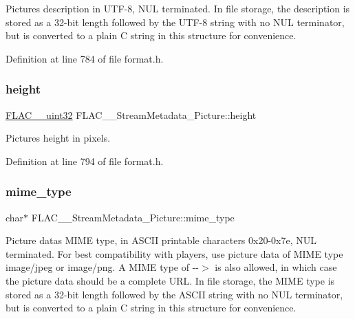 Picture\textquotesingle{}s description in U\+T\+F-\/8, N\+UL terminated. In file storage, the description is stored as a 32-\/bit length followed by the U\+T\+F-\/8 string with no N\+UL terminator, but is converted to a plain C string in this structure for convenience. 

Definition at line 784 of file format.\+h.

\mbox{\label{struct_f_l_a_c_____stream_metadata___picture_a76dbd1212d330807cda289660f5ee754}} 
\subsubsection{\texorpdfstring{height}{height}}
{\footnotesize\ttfamily \mbox{\hyperlink{ordinals_8h_a9c4005ea7ef8d564b0cc993cdd0e4e5e}{F\+L\+A\+C\+\_\+\+\_\+uint32}} F\+L\+A\+C\+\_\+\+\_\+\+Stream\+Metadata\+\_\+\+Picture\+::height}

Picture\textquotesingle{}s height in pixels. 

Definition at line 794 of file format.\+h.

\mbox{\label{struct_f_l_a_c_____stream_metadata___picture_a9b4af2e10b627c0e79abf4cdd79f80e0}} 
\subsubsection{\texorpdfstring{mime\_type}{mime\_type}}
{\footnotesize\ttfamily char$\ast$ F\+L\+A\+C\+\_\+\+\_\+\+Stream\+Metadata\+\_\+\+Picture\+::mime\+\_\+type}

Picture data\textquotesingle{}s M\+I\+ME type, in A\+S\+C\+II printable characters 0x20-\/0x7e, N\+UL terminated. For best compatibility with players, use picture data of M\+I\+ME type {\ttfamily image/jpeg} or {\ttfamily image/png}. A M\+I\+ME type of \textquotesingle{}-\/-\/$>$\textquotesingle{} is also allowed, in which case the picture data should be a complete U\+RL. In file storage, the M\+I\+ME type is stored as a 32-\/bit length followed by the A\+S\+C\+II string with no N\+UL terminator, but is converted to a plain C string in this structure for convenience. 

